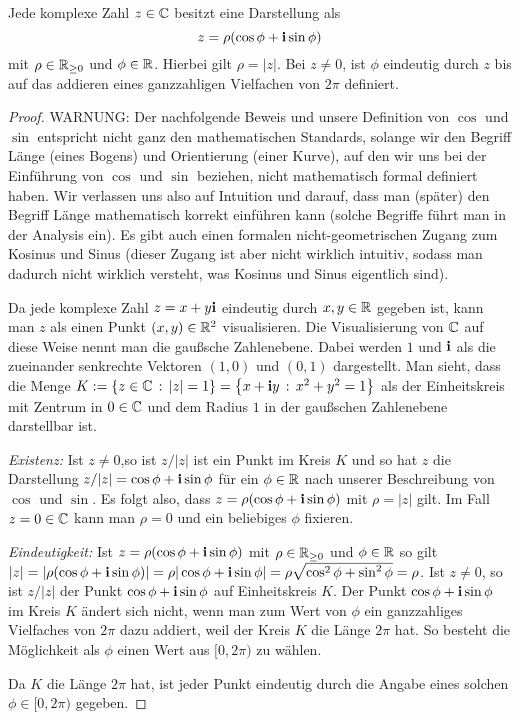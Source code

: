 \begin{thm}
	Jede komplexe Zahl $z \in \mathbb{C}$ besitzt eine Darstellung als 
	\[
		z = \rho ( \cos \phi + \mathbf{i} \sin \phi )
	\]
	mit $\rho \in \mathbb{R}_{\ge 0}$ und $\phi \in \mathbb{R}$. Hierbei gilt $\rho = |z|$. Bei $z \ne 0$, ist $\phi$ eindeutig durch $z$ bis auf das addieren eines ganzzahligen Vielfachen von $2 \pi$ definiert. 
\end{thm}

\begin{proof}  
	{\color{red} WARNUNG:} Der nachfolgende Beweis und unsere Definition von $\cos$ und $\sin$ entspricht nicht ganz den mathematischen Standards, solange wir den Begriff  Länge (eines Bogens) und Orientierung (einer Kurve), auf den  wir uns bei der Einführung von $\cos$ und $\sin$ beziehen, nicht mathematisch formal definiert haben. Wir verlassen uns also auf Intuition und darauf, dass man (später) den Begriff Länge mathematisch korrekt einführen kann (solche Begriffe führt man in der Analysis ein). Es gibt auch einen formalen nicht-geometrischen Zugang zum Kosinus und Sinus (dieser Zugang ist aber nicht wirklich intuitiv, sodass man dadurch nicht wirklich versteht, was Kosinus und Sinus eigentlich sind). 
	
	Da jede komplexe Zahl $z = x + y \mathbf{i}$ eindeutig durch $x, y \in \mathbb{R}$ gegeben ist, kann man $z$ als einen Punkt $(x,y) \in \mathbb{R}^2$ visualisieren. Die Visualisierung von $\mathbb{C}$ auf diese Weise nennt man die gaußsche Zahlenebene. Dabei werden $1$ und $\mathbf{i}$ als die zueinander senkrechte Vektoren $(1,0)$ und $(0,1)$ dargestellt. Man sieht, dass die Menge $K := \left\{ z \in \mathbb{C} \,:\, |z|=1 \right\} = \left\{  x+ \mathbf{i} y \,:\, x^2 + y^2 =1 \right\}$ als  der Einheitskreis mit Zentrum in $0 \in \mathbb{C}$ und dem Radius $1$ in der gaußschen Zahlenebene darstellbar ist. 
	
	\emph{Existenz:} Ist $z \ne 0$,so ist $z / |z|$ ist ein Punkt im Kreis $K$ und so hat $z$ die Darstellung $ z / |z| = \cos \phi + \mathbf{i} \sin \phi$ für ein $\phi \in \mathbb{R}$ nach unserer Beschreibung von $\cos$ und $\sin$. Es folgt also, dass $z = \rho ( \cos \phi + \mathbf{i} \sin \phi)$ mit $\rho = |z|$ gilt. Im Fall $z= 0 \in \mathbb{C}$ kann man $\rho =0$ und ein beliebiges $\phi$ fixieren. 
	
	\emph{Eindeutigkeit:} Ist $z = \rho (\cos \phi + \mathbf{i} \sin \phi)$ mit $\rho \in \mathbb{R}_{\ge 0}$ und $\phi \in \mathbb{R}$ so gilt $|z| = | \rho (\cos \phi + \mathbf{i} \sin \phi) | = \rho | \cos \phi + \mathbf{i} \sin \phi| = \rho \sqrt{ \cos^2 \phi + \sin^2\phi } = \rho$. Ist $z \ne 0$, so ist 
	$ z/ |z|$ der Punkt $\cos \phi + \mathbf{i} \sin \phi$ auf Einheitskreis $K$. Der Punkt $\cos \phi + \mathbf{i} \sin \phi$ im Kreis $K$ ändert sich nicht, wenn man zum Wert von $\phi$  ein ganzzahliges Vielfaches von $2 \pi$ dazu addiert, weil der Kreis $K$ die Länge $2\pi$ hat. So besteht die Möglichkeit als $\phi$ einen Wert aus $[0,2 \pi)$ zu wählen. 
	
	 Da $K$ die Länge $2\pi$ hat, ist jeder Punkt eindeutig durch die Angabe eines solchen $\phi \in [0,2 \pi)$ gegeben. 
\end{proof} 

